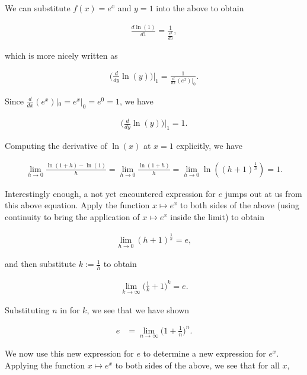We can substitute $f(x) = e^x$ and $y = 1$ into the above to obtain

\begin{align*}
    \frac{d\ln(1)}{d1} = \frac{1}{\frac{e^0}{d0}},
\end{align*}

which is more nicely written as

\begin{align*}
    \Big( \frac{d}{dy} \ln(y) \Big)\Big|_1 = \frac{1}{\frac{d}{dx}(e^x)|_0}.
\end{align*}

Since $\frac{d}{dx}(e^x)|_0 = e^x|_0 = e^0 = 1$, we have

\begin{align*}
    \Big(\frac{d}{dy} \ln(y)\Big)\Big|_1 = 1.
\end{align*}

Computing the derivative of $\ln(x)$ at $x = 1$ explicitly, we have

\begin{align*}
    \lim_{h \rightarrow 0} \frac{\ln(1 + h) - \ln(1)}{h} = \lim_{h \rightarrow 0} \frac{\ln(1 + h)}{h} = \lim_{h \rightarrow 0} \ln((h + 1)^\frac{1}{h}) = 1.
\end{align*}

Interestingly enough, a not yet encountered expression for $e$ jumps out at us from this above equation. Apply the function $x \mapsto e^x$ to both sides of the above (using continuity to bring the application of $x \mapsto e^x$ inside the limit) to obtain

\begin{align*}
    \lim_{h \rightarrow 0} (h + 1)^{\frac{1}{h}} = e,
\end{align*}

and then substitute $k := \frac{1}{h}$ to obtain

\begin{align*}
   \lim_{k \rightarrow \infty} \Big( \frac{1}{k} + 1 \Big)^k = e.
\end{align*}

Substituting $n$ in for $k$, we see that we have shown

\begin{align*}
    e &= \lim_{n \rightarrow \infty} \Big(1 + \frac{1}{n} \Big)^n.
\end{align*}

We now use this new expression for $e$ to determine a new expression for $e^x$. Applying the function $x \mapsto e^x$ to both sides of the above, we see that for all $x$,

